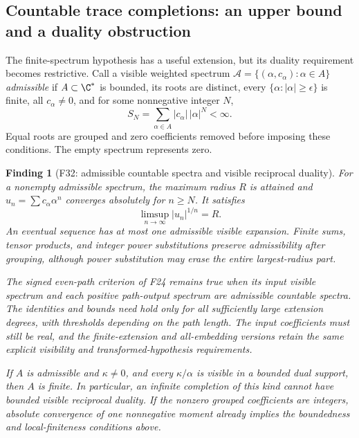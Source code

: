 \documentclass[11pt,a4paper]{article}
\newcommand{\fid}[1]{\textsf{#1}}\newcommand{\gate}[1]{\textsf{#1}}
\theoremstyle{named}\newtheorem{finding}{Finding}[section]
\theoremstyle{definition}\newtheorem{definition}[finding]{Definition}
\theoremstyle{remark}\newtheorem{remark}[finding]{Remark}
\begin{document}
\subsection{Countable trace completions: an upper bound and a duality obstruction}
The finite-spectrum hypothesis has a useful extension, but its duality
requirement becomes restrictive. Call a visible weighted spectrum
$\mathcal A=\{(\alpha,c_\alpha):\alpha\in A\}$ \emph{admissible} if
$A\subset\C^*$ is bounded, its roots are distinct, every
$\{\alpha:|\alpha|\ge\epsilon\}$ is finite, all $c_\alpha\ne0$, and
for some nonnegative integer $N$,
\[
 S_N=\sum_{\alpha\in A}|c_\alpha|\,|\alpha|^N<\infty.
\]
Equal roots are grouped and zero coefficients removed before imposing
these conditions. The empty spectrum represents zero.

\begin{finding}[\fid{F32}: admissible countable spectra and visible reciprocal duality]\label{f:countable}
For a nonempty admissible spectrum, the maximum radius $R$ is attained
and $u_n=\sum c_\alpha\alpha^n$ converges absolutely for $n\ge N$.
It satisfies
\[
 \limsup_{n\to\infty}|u_n|^{1/n}=R.
\]
An eventual sequence has at most one admissible visible expansion.
Finite sums, tensor products, and integer power substitutions preserve
admissibility after grouping, although power substitution may erase the
entire largest-radius part.

The signed even-path criterion of \fid{F24} remains true when its
input visible spectrum and each positive path-output spectrum are
admissible countable spectra. The identities and bounds need hold only
for all sufficiently large extension degrees, with thresholds depending
on the path length. The input coefficients must still be real, and the
finite-extension and all-embedding versions retain the same explicit
visibility and transformed-hypothesis requirements.

If $A$ is admissible and $\kappa\ne0$, and every $\kappa/\alpha$ is
visible in a bounded dual support, then $A$ is finite. In particular,
an infinite completion of this kind cannot have bounded visible
reciprocal duality. If the nonzero grouped coefficients are integers,
absolute convergence of one nonnegative moment already implies the
boundedness and local-finiteness conditions above.
\end{finding}
\end{document}
